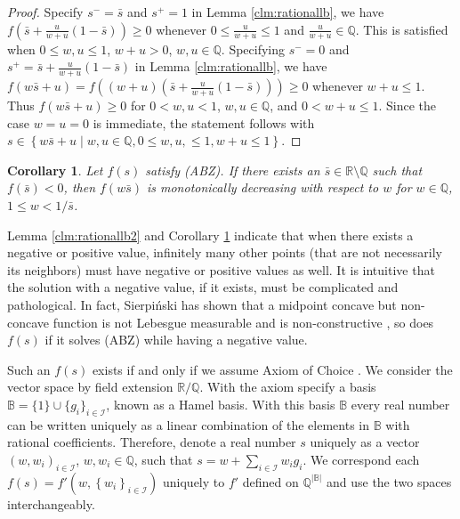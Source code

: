 \documentclass{article}
\newtheorem{corollary}[theorem]{Corollary}
\theoremstyle{named}
\newcommand{\RR}{\mathbb{R}}
\newcommand{\QQ}{\mathbb{Q}}
\newcommand{\BB}{\mathbb{B}}
\newcommand{\cI}{\mathcal{I}}
\newcommand{\set}[1]{\left\{#1\right\}}
\begin{document}
\begin{proof}
Specify $s^-=\bar s$ and $s^+=1$ in Lemma \ref{clm:rationallb}, we have $f(\bar s + \frac{u}{w+u}(1-\bar s)) \geq 0$ whenever $0\leq \frac{u}{w+u} \leq 1$ and $\frac{u}{w+u}\in \QQ$. This is satisfied when $0\leq w,u\leq 1$, $w+u>0$, $w,u\in \QQ$. Specifying $s^-=0$ and $s^+=\bar s + \frac{u}{w+u}(1-\bar s)$ in Lemma \ref{clm:rationallb}, we have $f(w\bar s+u)=f((w+u)(\bar s + \frac{u}{w+u}(1-\bar s)))\geq 0$ whenever $w+u\leq 1$. Thus $f(w\bar s+u)\geq 0$ for $0<w, u<1$, $w,u\in \QQ$, and $0<w+u\leq 1$. Since the case $w=u=0$ is immediate, the statement follows with $s\in \set{w\bar{s}+u\mid w,u\in \QQ, 0\leq w, u, \leq 1, w+u\leq 1}$.
\end{proof}

\begin{corollary}
\label{clm:rationallb3}
Let $f(s)$ satisfy ({ABZ}). If there exists an $\bar{s}\in \RR\setminus\QQ$ such that $f(\bar{s})< 0$, then $f(w\bar s)$ is monotonically decreasing with respect to $w$ for $w\in \QQ$, $1\leq w<1/\bar s$.
\end{corollary}

Lemma \ref{clm:rationallb2} and Corollary \ref{clm:rationallb3} indicate that when there exists a negative or positive value, infinitely many other points (that are not necessarily its neighbors) must have negative or positive values as well. It is intuitive that the solution with a negative value, if it exists, must be complicated and pathological. In fact, Sierpi{\'n}ski has shown that a midpoint concave but non-concave function is not Lebesgue measurable and is non-constructive \citep{sierpinski1920equation,sierpinski1920fonctions}, so does $f(s)$ if it solves ({ABZ}) while having a negative value.

Such an $f(s)$ exists if and only if we assume Axiom of Choice \citep{jech2008axiom,sierpinski1920equation,sierpinski1920fonctions}. We consider the vector space by field extension $\RR/\QQ$. With the axiom specify a basis $\BB=\{1\}\cup\{g_i\}_{i\in\cI}$, known as a Hamel basis.
With this basis $\BB$ every real number can be written uniquely as a linear combination of the elements in $\BB$ with rational coefficients. 
Therefore, denote a real number $s$ uniquely as a vector $(w, w_i)_{i\in \cI}$, $w, w_i\in\QQ$, such that $s=w+\sum_{i\in\cI} w_ig_i$. We correspond each $f(s)=f'(w, \set{w_i}_{i\in \cI})$ uniquely to $f'$ defined on $\QQ^{\left|\BB\right|}$ and use the two spaces interchangeably.
\end{document}
